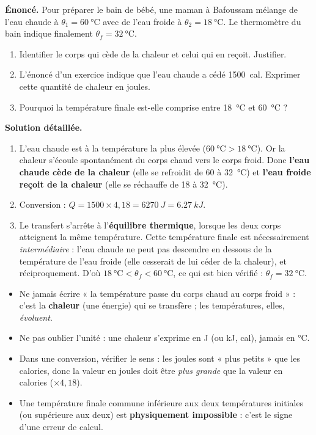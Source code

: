 \documentclass[11pt]{article}
\begin{document}
\begin{exoresolu}
\textbf{Énoncé.} Pour préparer le bain de bébé, une maman à Bafoussam mélange de l'eau chaude à $\theta_1 = \SI{60}{\celsius}$ avec de l'eau froide à $\theta_2 = \SI{18}{\celsius}$. Le thermomètre du bain indique finalement $\theta_f = \SI{32}{\celsius}$.
\begin{enumerate}
\item Identifier le corps qui cède de la chaleur et celui qui en reçoit. Justifier.
\item L'énoncé d'un exercice indique que l'eau chaude a cédé \SI{1500}{cal}. Exprimer cette quantité de chaleur en joules.
\item Pourquoi la température finale est-elle comprise entre \SI{18}{\celsius} et \SI{60}{\celsius} ?
\end{enumerate}
\tcblower
\textbf{Solution détaillée.}
\begin{enumerate}
\item L'eau chaude est à la température la plus élevée ($\SI{60}{\celsius} > \SI{18}{\celsius}$). Or la chaleur s'écoule spontanément du corps chaud vers le corps froid. Donc \textbf{l'eau chaude cède de la chaleur} (elle se refroidit de 60 à \SI{32}{\celsius}) et \textbf{l'eau froide reçoit de la chaleur} (elle se réchauffe de 18 à \SI{32}{\celsius}).
\item Conversion : $Q = 1500 \times 4{,}18 = \SI{6270}{J} = \SI{6,27}{kJ}$.
\item Le transfert s'arrête à l'\textbf{équilibre thermique}, lorsque les deux corps atteignent la même température. Cette température finale est nécessairement \emph{intermédiaire} : l'eau chaude ne peut pas descendre en dessous de la température de l'eau froide (elle cesserait de lui céder de la chaleur), et réciproquement. D'où $\SI{18}{\celsius} < \theta_f < \SI{60}{\celsius}$, ce qui est bien vérifié : $\theta_f = \SI{32}{\celsius}$.
\end{enumerate}
\end{exoresolu}

\begin{attention}
\begin{itemize}
\item Ne jamais écrire « la température passe du corps chaud au corps froid » : c'est la \textbf{chaleur} (une énergie) qui se transfère ; les températures, elles, \emph{évoluent}.
\item Ne pas oublier l'unité : une chaleur s'exprime en \si{J} (ou \si{kJ}, \si{cal}), jamais en \si{\celsius}.
\item Dans une conversion, vérifier le sens : les joules sont « plus petits » que les calories, donc la valeur en joules doit être \emph{plus grande} que la valeur en calories ($\times 4{,}18$).
\item Une température finale commune inférieure aux deux températures initiales (ou supérieure aux deux) est \textbf{physiquement impossible} : c'est le signe d'une erreur de calcul.
\end{itemize}
\end{attention}
\end{document}
